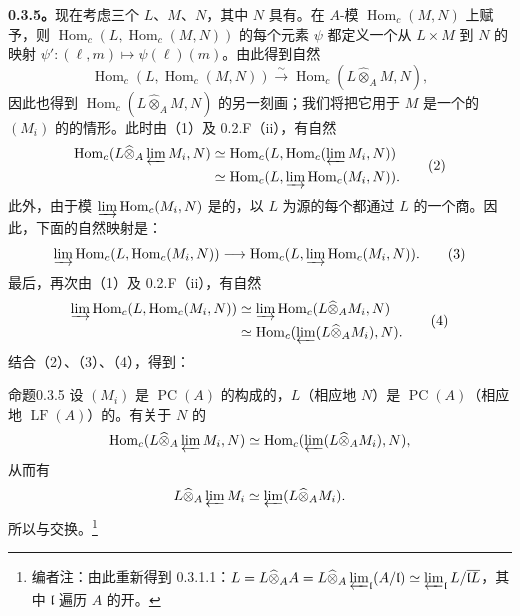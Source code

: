 \textbf{0.3.5。}现在考虑三个 $L$、$M$、$N$，其中 $N$ 具有。在 $A$-模 $\operatorname{Hom}_c(M,N)$ 上赋予，则 $\operatorname{Hom}_c(L,\operatorname{Hom}_c(M,N))$ 的每个元素 $\psi$ 都定义一个从 $L\times M$ 到 $N$ 的映射 $\psi':(\ell,m)\mapsto\psi(\ell)(m)$。由此得到自然
\[
\operatorname{Hom}_c(L,\operatorname{Hom}_c(M,N))\xrightarrow{\sim}\operatorname{Hom}_c(L\widehat\otimes_A M,N),\tag{1}
\]
因此也得到 $\operatorname{Hom}_c(L\widehat\otimes_A M,N)$ 的另一刻画；我们将把它用于 $M$ 是一个的 $(M_i)$ 的的情形。此时由（1）及 0.2.F（ii），有自然
\[
\begin{aligned}
\operatorname{Hom}_c(L\widehat\otimes_A\varprojlim M_i,N)
 &\simeq\operatorname{Hom}_c(L,\operatorname{Hom}_c(\varprojlim M_i,N))\\
 &\simeq\operatorname{Hom}_c(L,\varinjlim\operatorname{Hom}_c(M_i,N)).
\end{aligned}\tag{2}
\]
此外，由于模 $\varinjlim\operatorname{Hom}_c(M_i,N)$ 是的，以 $L$ 为源的每个都通过 $L$ 的一个商。因此，下面的自然映射是：
\[
\varinjlim\operatorname{Hom}_c(L,\operatorname{Hom}_c(M_i,N))
\longrightarrow\operatorname{Hom}_c(L,\varinjlim\operatorname{Hom}_c(M_i,N)).\tag{3}
\]
最后，再次由（1）及 0.2.F（ii），有自然
\[
\begin{aligned}
\varinjlim\operatorname{Hom}_c(L,\operatorname{Hom}_c(M_i,N))
 &\simeq\varinjlim\operatorname{Hom}_c(L\widehat\otimes_A M_i,N)\\
 &\simeq\operatorname{Hom}_c(\varprojlim(L\widehat\otimes_A M_i),N).
\end{aligned}\tag{4}
\]
结合（2）、（3）、（4），得到：
\begin{SGAresult}{命题}{0.3.5}
设 $(M_i)$ 是 $\operatorname{PC}(A)$ 的构成的，$L$（相应地 $N$）是 $\operatorname{PC}(A)$（相应地 $\operatorname{LF}(A)$）的。有关于 $N$ 的
\[
 \operatorname{Hom}_c(L\widehat\otimes_A\varprojlim M_i,N)
 \simeq\operatorname{Hom}_c(\varprojlim(L\widehat\otimes_A M_i),N),
\]
从而有
\[L\widehat\otimes_A\varprojlim M_i\simeq\varprojlim(L\widehat\otimes_A M_i).\]
所以与交换。\footnote{编者注：由此重新得到 0.3.1.1：$L=L\widehat\otimes_A A=L\widehat\otimes_A\varprojlim_{\mathfrak l}(A/\mathfrak l)\simeq\varprojlim_{\mathfrak l}L/\overline{\mathfrak lL}$，其中 $\mathfrak l$ 遍历 $A$ 的开。}
\end{SGAresult}

